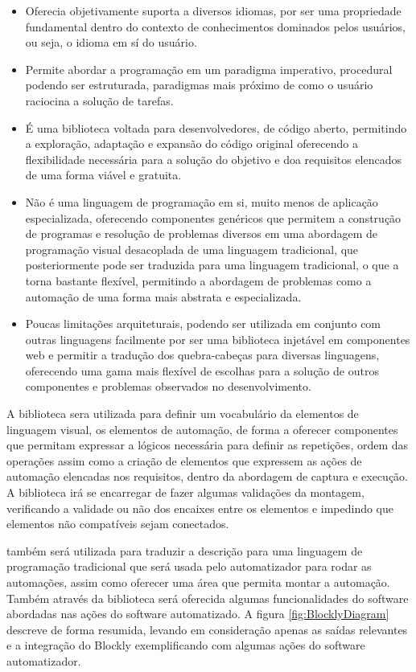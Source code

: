 \documentclass[tg]{mdtufsm}
\begin{document}
                \begin{itemize}
                    \item Oferecia objetivamente suporta a diversos idiomas, por ser uma propriedade fundamental dentro do contexto de conhecimentos dominados pelos usuários, ou seja, o idioma em sí do usuário.
                    \item Permite abordar a programação em um paradigma imperativo, procedural podendo ser estruturada, paradigmas mais próximo de como o usuário raciocina a solução de tarefas.
                    \item É uma biblioteca voltada para desenvolvedores, de código aberto, permitindo a exploração, adaptação e expansão do código original oferecendo a flexibilidade necessária para a solução do objetivo e doa requisitos elencados de uma forma viável e gratuita.
                    \item Não é uma linguagem de programação em si, muito menos de aplicação especializada, oferecendo componentes genéricos que permitem a construção de programas e resolução de problemas diversos em uma abordagem de programação visual desacoplada de uma linguagem tradicional, que posteriormente pode ser traduzida para uma linguagem tradicional, o que a torna bastante flexível, permitindo a abordagem de problemas como a automação de uma forma mais abstrata e especializada.
                    \item Poucas limitações arquiteturais, podendo ser utilizada em conjunto com outras linguagens facilmente por ser uma biblioteca injetável em componentes web e permitir a tradução dos quebra-cabeças para diversas linguagens, oferecendo uma gama mais flexível de escolhas para a solução de outros componentes e problemas observados no desenvolvimento.
                \end{itemize}

                A biblioteca sera utilizada para definir um vocabulário da elementos de linguagem visual, os elementos de automação, de forma a oferecer componentes que permitam expressar a lógicos necessária para definir as repetições, ordem das operações assim como a criação de elementos que expressem as ações de automação elencadas nos requisitos, dentro da abordagem de captura e execução. A biblioteca irá se encarregar de fazer algumas validações da montagem, verificando a validade ou não dos encaixes entre os elementos e impedindo que elementos não compatíveis sejam conectados.

                também será utilizada para traduzir a descrição para uma linguagem de programação tradicional que será usada pelo automatizador para rodar as automações, assim como oferecer uma área que permita montar a automação. Também através da biblioteca será oferecida algumas funcionalidades do software abordadas nas ações do software automatizado. A figura \ref{fig:BlocklyDiagram} descreve de forma resumida, levando em consideração apenas as saídas relevantes e a integração do Blockly exemplificando com algumas ações do software automatizador.
\end{document}
